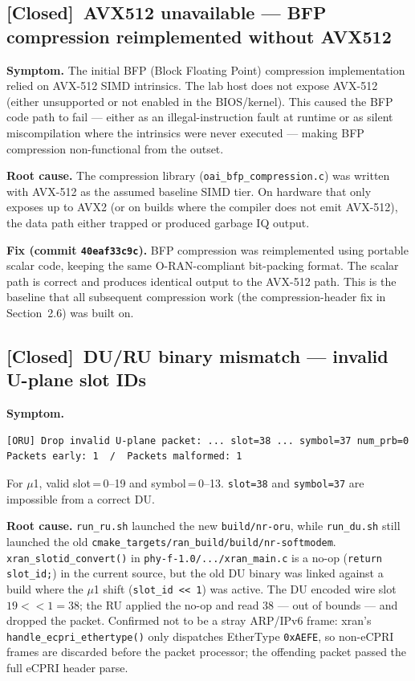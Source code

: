 \documentclass[11pt,a4paper]{article}
\newcommand{\closed}{\textcolor{closedcol}{\textbf{[Closed]}}}
\begin{document}
\subsection{\texorpdfstring{\closed}{[Closed]}\ AVX512 unavailable --- BFP compression reimplemented without AVX512}

\textbf{Symptom.}
The initial BFP (Block Floating Point) compression implementation relied on AVX-512 SIMD
intrinsics. The lab host does not expose AVX-512 (either unsupported or not enabled in the
BIOS/kernel). This caused the BFP code path to fail --- either as an illegal-instruction
fault at runtime or as silent miscompilation where the intrinsics were never executed ---
making BFP compression non-functional from the outset.

\textbf{Root cause.}
The compression library (\texttt{oai_bfp_compression.c}) was written with AVX-512 as the
assumed baseline SIMD tier. On hardware that only exposes up to AVX2 (or on builds where the
compiler does not emit AVX-512), the data path either trapped or produced garbage IQ output.

\textbf{Fix (commit \texttt{40eaf33c9c}).}
BFP compression was reimplemented using portable scalar code, keeping the same
O-RAN-compliant bit-packing format. The scalar path is correct and produces identical output
to the AVX-512 path. This is the baseline that all subsequent compression work (the
compression-header fix in Section~2.6) was built on.

\subsection{\texorpdfstring{\closed}{[Closed]}\ DU/RU binary mismatch --- invalid U-plane slot IDs}

\textbf{Symptom.}
\begin{lstlisting}
[ORU] Drop invalid U-plane packet: ... slot=38 ... symbol=37 num_prb=0
Packets early: 1  /  Packets malformed: 1
\end{lstlisting}
For $\mu$1, valid slot\,=\,0--19 and symbol\,=\,0--13.
\texttt{slot=38} and \texttt{symbol=37} are impossible from a correct DU.

\textbf{Root cause.}
\texttt{run_ru.sh} launched the new \texttt{build/nr-oru}, while \texttt{run_du.sh} still
launched the old \texttt{cmake_targets/ran_build/build/nr-softmodem}.
\texttt{xran_slotid_convert()} in \texttt{phy-f-1.0/.../xran_main.c} is a no-op
(\texttt{return slot_id;}) in the current source, but the old DU binary was linked against a
build where the $\mu$1 shift (\texttt{slot\_id <{}< 1}) was active. The DU encoded wire slot
$19 << 1 = 38$; the RU applied the no-op and read 38 --- out of bounds --- and dropped the
packet. Confirmed not to be a stray ARP/IPv6 frame: xran's \texttt{handle_ecpri_ethertype()}
only dispatches EtherType \texttt{0xAEFE}, so non-eCPRI frames are discarded before the
packet processor; the offending packet passed the full eCPRI header parse.
\end{document}
